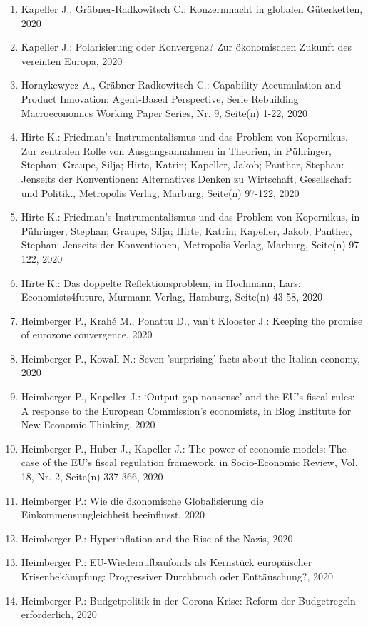 \begin{enumerate}
	 \item Kapeller J., Gräbner-Radkowitsch C.: Konzernmacht in globalen Güterketten, 2020
	 \item Kapeller J.: Polarisierung oder Konvergenz? Zur ökonomischen Zukunft des vereinten Europa, 2020
	 \item Hornykewycz A., Gräbner-Radkowitsch C.: Capability Accumulation and Product Innovation: Agent-Based Perspective, Serie Rebuilding Macroeconomics Working Paper Series, Nr. 9, Seite(n) 1-22, 2020
	 \item Hirte K.: Friedman’s Instrumentalismus und das Problem von Kopernikus. Zur zentralen Rolle von Ausgangsannahmen in Theorien, in Pühringer, Stephan; Graupe, Silja; Hirte, Katrin; Kapeller, Jakob; Panther, Stephan: Jenseits der Konventionen: Alternatives Denken zu Wirtschaft, Gesellschaft und Politik., Metropolis Verlag, Marburg, Seite(n) 97-122, 2020
	 \item Hirte K.: Friedman’s Instrumentalismus und das Problem von Kopernikus, in Pühringer, Stephan; Graupe, Silja; Hirte, Katrin; Kapeller, Jakob; Panther, Stephan: Jenseits der Konventionen, Metropolis Verlag, Marburg, Seite(n) 97-122, 2020
	 \item Hirte K.: Das doppelte Reflektionsproblem, in Hochmann, Lars: Economists4future, Murmann Verlag, Hamburg, Seite(n) 43-58, 2020
	 \item Heimberger P., Krahé M., Ponattu D., van't Klooster J.: Keeping the promise of eurozone convergence, 2020
	 \item Heimberger P., Kowall N.: Seven ’surprising’ facts about the Italian economy, 2020
	 \item Heimberger P., Kapeller J.: ‘Output gap nonsense’ and the EU’s fiscal rules: A response to the European Commission’s economists, in Blog Institute for New Economic Thinking, 2020
	 \item Heimberger P., Huber J., Kapeller J.: The power of economic models: The case of the EU's fiscal regulation framework, in Socio-Economic Review, Vol. 18, Nr. 2, Seite(n) 337-366, 2020
	 \item Heimberger P.: Wie die ökonomische Globalisierung die Einkommensungleichheit beeinflusst, 2020
	 \item Heimberger P.: Hyperinflation and the Rise of the Nazis, 2020
	 \item Heimberger P.: EU-Wiederaufbaufonds als Kernstück europäischer Krisenbekämpfung: Progressiver Durchbruch oder Enttäuschung?, 2020
	 \item Heimberger P.: Budgetpolitik in der Corona-Krise: Reform der Budgetregeln erforderlich, 2020

\end{enumerate}
